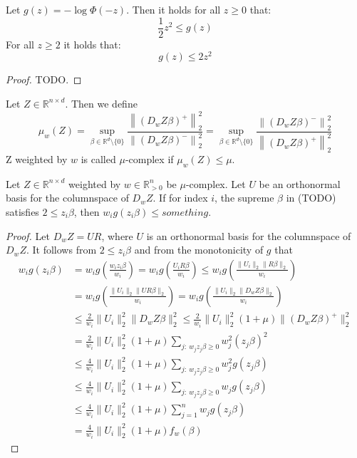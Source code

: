 \begin{lemma}
    Let $g(z) = -\log \Phi(-z)$. Then it holds for all $z \geq 0$ that:
    $$
        \frac{1}{2} z^2 \leq g(z)
    $$
    For all $z \geq 2$ it holds that:
    $$
        g(z) \leq 2z^2
    $$
\end{lemma}
\begin{proof}
    TODO.
\end{proof}

\begin{definition}
    Let $Z \in \mathbb{R}^{n \times d}$. Then we define
    $$
        \mu_w(Z) = \sup_{\beta \in \mathbb{R}^d \setminus \{0\}}
        \frac{\left \lVert (D_w Z \beta)^+ \right \rVert_2^2}
        {\left \lVert (D_w Z \beta)^- \right \rVert_2^2}
        =
        \sup_{\beta \in \mathbb{R}^d \setminus \{0\}}
        \frac{\left \lVert (D_w Z \beta)^- \right \rVert_2^2}
        {\left \lVert (D_w Z \beta)^+ \right \rVert_2^2}
    $$
    Z weighted by $w$ is called $\mu$-complex if $\mu_w(Z) \leq \mu$.
\end{definition}

\begin{lemma}
    Let $Z \in \mathbb{R}^{n \times d}$ weighted by $w \in \mathbb{R}^n_{>0}$
    be $\mu$-complex. Let $U$ be an orthonormal basis for the columnspace
    of $D_w Z$. If for index $i$, the supreme $\beta$ in (TODO) satisfies
    $2 \leq z_i \beta$, then $w_i g(z_i \beta) \leq something$.
\end{lemma}
\begin{proof}
    Let $D_w Z = UR$, where $U$ is an orthonormal basis for the columnspace
    of $D_w Z$. It follows from $2 \leq z_i \beta$ and from the monotonicity
    of $g$ that
    \begin{align*}
        w_i g(z_i \beta)
         & = w_i g\left(\frac{w_i z_i \beta}{w_i}\right)
        = w_i g\left(\frac{U_i R \beta}{w_i}\right)
        \leq w_i g\left(\frac{\lVert U_i \rVert_2 \lVert R \beta \rVert_2}{w_i}\right)                             \\
         & = w_i g\left(\frac{\lVert U_i \rVert_2 \lVert U R \beta \rVert_2}{w_i}\right)
        = w_i g\left(\frac{\lVert U_i \rVert_2 \lVert D_w Z \beta \rVert_2}{w_i}\right)                            \\
         & \leq \frac{2}{w_i} \lVert U_i \rVert_2^2 \lVert D_w Z \beta \rVert_2^2
        \leq \frac{2}{w_i} \lVert U_i \rVert_2^2 (1 + \mu) \lVert (D_w Z \beta)^+ \rVert_2^2                       \\
         & = \frac{2}{w_i} \lVert U_i \rVert_2^2 (1 + \mu) \sum_{j: \  w_j z_j \beta \geq 0} w_j^2 (z_j \beta)^2   \\
         & \leq \frac{4}{w_i} \lVert U_i \rVert_2^2 (1 + \mu) \sum_{j: \  w_j z_j \beta \geq 0} w_j^2 g(z_j \beta) \\
         & \leq \frac{4}{w_i} \lVert U_i \rVert_2^2 (1 + \mu) \sum_{j: \  w_j z_j \beta \geq 0} w_j g(z_j \beta)   \\
         & \leq \frac{4}{w_i} \lVert U_i \rVert_2^2 (1 + \mu) \sum_{j = 1}^n w_j g(z_j \beta)                      \\
         & = \frac{4}{w_i} \lVert U_i \rVert_2^2 (1 + \mu) f_w(\beta)
    \end{align*}
\end{proof}
